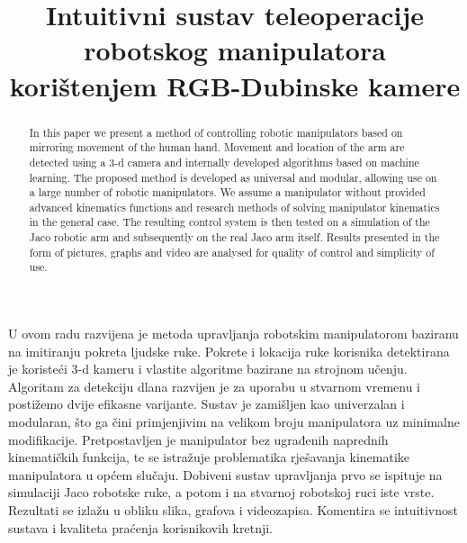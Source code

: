 \documentclass[times, utf8, diplomski, numeric]{fer}
\title{Intuitivni sustav teleoperacije robotskog manipulatora korištenjem RGB-Dubinske kamere}
\begin{document}
\begin{sazetak}
U ovom radu razvijena je metoda upravljanja robotskim manipulatorom baziranu na imitiranju pokreta ljudske ruke. Pokrete i lokacija ruke korisnika detektirana je koristeći 3-d kameru i vlastite algoritme bazirane na strojnom učenju. Algoritam za detekciju dlana razvijen je za uporabu u stvarnom vremenu i postižemo dvije efikasne varijante. Sustav je zamišljen kao univerzalan i modularan, što ga čini primjenjivim na velikom broju manipulatora uz minimalne modifikacije. Pretpostavljen je manipulator bez ugrađenih naprednih kinematičkih funkcija, te se istražuje problematika rješavanja kinematike manipulatora u općem slučaju. Dobiveni sustav upravljanja prvo se ispituje na simulaciji Jaco robotske ruke, a potom i na stvarnoj robotskoj ruci iste vrste. Rezultati se izlažu u obliku slika, grafova i videozapisa. Komentira se intuitivnost sustava i kvaliteta praćenja korisnikovih kretnji.

\end{sazetak}

\begin{abstract}
In this paper we present a method of controlling robotic manipulators based on mirroring movement of the human hand. Movement and location of the arm are detected using a 3-d camera and internally developed algorithms based on machine learning. The proposed method is developed as universal and modular, allowing use on a large number of robotic manipulators. We assume a manipulator without provided advanced kinematics functions and research methods of solving manipulator kinematics in the general case. The resulting control system is then tested on a simulation of the Jaco robotic arm and subsequently on the real Jaco arm itself. Results presented in the form of pictures, graphs and video are analysed for quality of control and simplicity of use.

\end{abstract}
\end{document}
